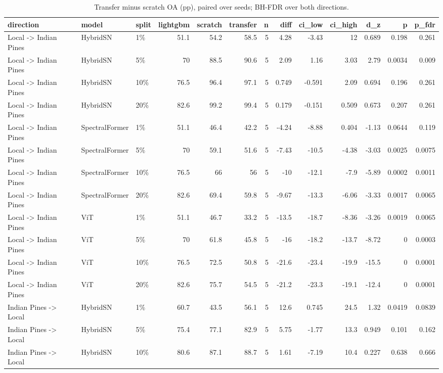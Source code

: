 \begin{table}
\caption{Transfer minus scratch OA (pp), paired over seeds; BH-FDR over both directions.}
\label{tab:stats_transfer}
\begin{tabular}{lllrrrrrrrrrr}
\toprule
direction & model & split & lightgbm & scratch & transfer & n & diff & ci\_low & ci\_high & d\_z & p & p\_fdr \\
\midrule
Local -> Indian Pines & HybridSN & 1\% & 51.1 & 54.2 & 58.5 & 5 & 4.28 & -3.43 & 12 & 0.689 & 0.198 & 0.261 \\
Local -> Indian Pines & HybridSN & 5\% & 70 & 88.5 & 90.6 & 5 & 2.09 & 1.16 & 3.03 & 2.79 & 0.0034 & 0.009 \\
Local -> Indian Pines & HybridSN & 10\% & 76.5 & 96.4 & 97.1 & 5 & 0.749 & -0.591 & 2.09 & 0.694 & 0.196 & 0.261 \\
Local -> Indian Pines & HybridSN & 20\% & 82.6 & 99.2 & 99.4 & 5 & 0.179 & -0.151 & 0.509 & 0.673 & 0.207 & 0.261 \\
Local -> Indian Pines & SpectralFormer & 1\% & 51.1 & 46.4 & 42.2 & 5 & -4.24 & -8.88 & 0.404 & -1.13 & 0.0644 & 0.119 \\
Local -> Indian Pines & SpectralFormer & 5\% & 70 & 59.1 & 51.6 & 5 & -7.43 & -10.5 & -4.38 & -3.03 & 0.0025 & 0.0075 \\
Local -> Indian Pines & SpectralFormer & 10\% & 76.5 & 66 & 56 & 5 & -10 & -12.1 & -7.9 & -5.89 & 0.0002 & 0.0011 \\
Local -> Indian Pines & SpectralFormer & 20\% & 82.6 & 69.4 & 59.8 & 5 & -9.67 & -13.3 & -6.06 & -3.33 & 0.0017 & 0.0065 \\
Local -> Indian Pines & ViT & 1\% & 51.1 & 46.7 & 33.2 & 5 & -13.5 & -18.7 & -8.36 & -3.26 & 0.0019 & 0.0065 \\
Local -> Indian Pines & ViT & 5\% & 70 & 61.8 & 45.8 & 5 & -16 & -18.2 & -13.7 & -8.72 & 0 & 0.0003 \\
Local -> Indian Pines & ViT & 10\% & 76.5 & 72.5 & 50.8 & 5 & -21.6 & -23.4 & -19.9 & -15.5 & 0 & 0.0001 \\
Local -> Indian Pines & ViT & 20\% & 82.6 & 75.7 & 54.5 & 5 & -21.2 & -23.3 & -19.1 & -12.4 & 0 & 0.0001 \\
Indian Pines -> Local & HybridSN & 1\% & 60.7 & 43.5 & 56.1 & 5 & 12.6 & 0.745 & 24.5 & 1.32 & 0.0419 & 0.0839 \\
Indian Pines -> Local & HybridSN & 5\% & 75.4 & 77.1 & 82.9 & 5 & 5.75 & -1.77 & 13.3 & 0.949 & 0.101 & 0.162 \\
Indian Pines -> Local & HybridSN & 10\% & 80.6 & 87.1 & 88.7 & 5 & 1.61 & -7.19 & 10.4 & 0.227 & 0.638 & 0.666 \\

\end{tabular}
\end{table}
